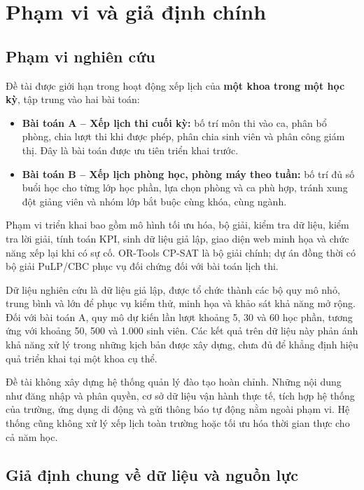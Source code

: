 \section{Phạm vi và giả định chính}
\label{sec:pham-vi}

\subsection{Phạm vi nghiên cứu}

Đề tài được giới hạn trong hoạt động xếp lịch của \textbf{một khoa trong một học kỳ}, tập trung vào hai bài toán:
\begin{itemize}
    \item \textbf{Bài toán A -- Xếp lịch thi cuối kỳ:} bố trí môn thi vào ca, phân bổ phòng, chia lượt thi khi được phép, phân chia sinh viên và phân công giám thị. Đây là bài toán được ưu tiên triển khai trước.
    \item \textbf{Bài toán B -- Xếp lịch phòng học, phòng máy theo tuần:} bố trí đủ số buổi học cho từng lớp học phần, lựa chọn phòng và ca phù hợp, tránh xung đột giảng viên và nhóm lớp bắt buộc cùng khóa, cùng ngành.
\end{itemize}

Phạm vi triển khai bao gồm mô hình tối ưu hóa, bộ giải, kiểm tra dữ liệu, kiểm tra lời giải, tính toán KPI, sinh dữ liệu giả lập, giao diện web minh họa và chức năng xếp lại khi có sự cố. OR-Tools CP-SAT là bộ giải chính; dự án đồng thời có bộ giải PuLP/CBC phục vụ đối chứng đối với bài toán lịch thi.

Dữ liệu nghiên cứu là dữ liệu giả lập, được tổ chức thành các bộ quy mô nhỏ, trung bình và lớn để phục vụ kiểm thử, minh họa và khảo sát khả năng mở rộng. Đối với bài toán A, quy mô dự kiến lần lượt khoảng 5, 30 và 60 học phần, tương ứng với khoảng 50, 500 và 1.000 sinh viên. Các kết quả trên dữ liệu này phản ánh khả năng xử lý trong những kịch bản được xây dựng, chưa đủ để khẳng định hiệu quả triển khai tại một khoa cụ thể.

Đề tài không xây dựng hệ thống quản lý đào tạo hoàn chỉnh. Những nội dung như đăng nhập và phân quyền, cơ sở dữ liệu vận hành thực tế, tích hợp hệ thống của trường, ứng dụng di động và gửi thông báo tự động nằm ngoài phạm vi. Hệ thống cũng không xử lý xếp lịch toàn trường hoặc tối ưu hóa thời gian thực cho cả năm học.

\subsection{Giả định chung về dữ liệu và nguồn lực}

